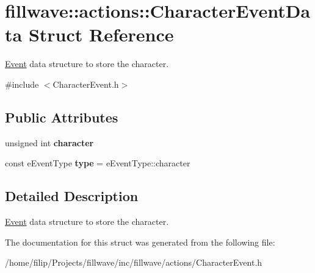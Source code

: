 \hypertarget{structfillwave_1_1actions_1_1CharacterEventData}{}\section{fillwave\+:\+:actions\+:\+:Character\+Event\+Data Struct Reference}
\label{structfillwave_1_1actions_1_1CharacterEventData}


\hyperlink{classfillwave_1_1actions_1_1Event}{Event} data structure to store the character.  




{\ttfamily \#include $<$Character\+Event.\+h$>$}

\subsection*{Public Attributes}
\begin{DoxyCompactItemize}
\item 
\hypertarget{structfillwave_1_1actions_1_1CharacterEventData_a378b8eb5aa654104714acd4101f57162}{}unsigned int {\bfseries character}\label{structfillwave_1_1actions_1_1CharacterEventData_a378b8eb5aa654104714acd4101f57162}

\item 
\hypertarget{structfillwave_1_1actions_1_1CharacterEventData_a2067f02a01602c7f40d5094eb089f550}{}const e\+Event\+Type {\bfseries type} = e\+Event\+Type\+::character\label{structfillwave_1_1actions_1_1CharacterEventData_a2067f02a01602c7f40d5094eb089f550}

\end{DoxyCompactItemize}


\subsection{Detailed Description}
\hyperlink{classfillwave_1_1actions_1_1Event}{Event} data structure to store the character. 

The documentation for this struct was generated from the following file\+:\begin{DoxyCompactItemize}
\item 
/home/filip/\+Projects/fillwave/inc/fillwave/actions/Character\+Event.\+h\end{DoxyCompactItemize}
